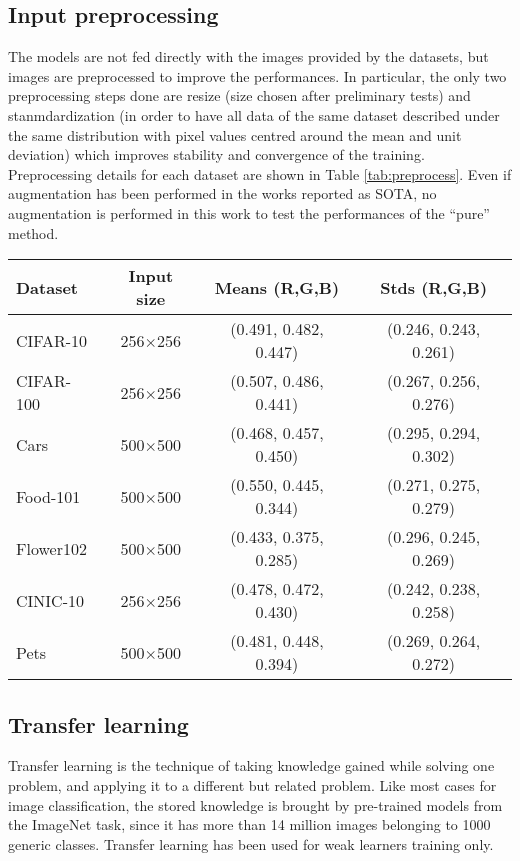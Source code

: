 \documentclass[review]{elsarticle}
\begin{document}
\subsection{Input preprocessing}
The models are not fed directly with the images provided by the datasets, but images are preprocessed to improve the performances. In particular, the only two preprocessing steps done are resize (size chosen after preliminary tests) and stanmdardization (in order to have all data of the same dataset described under the same distribution with pixel values centred around the mean and unit deviation) which improves stability and convergence of the training. Preprocessing details for each dataset are shown in Table \ref{tab:preprocess}. Even if augmentation has been performed in the works reported as SOTA, no augmentation is performed in this work to test the performances of the ``pure'' method.

\begin{table*}[h]
\caption{Input sizes and standardization values, for each channel, used for data preprocessing.}
\newcommand\T{\rule{0pt}{2.5ex}}
\begin{center}
\begin{tabular}{lccc}
{\bf Dataset} &  {\bf Input size} & {\bf Means (R,G,B)}  & {\bf Stds (R,G,B)}\\
    \hline
    \T
    CIFAR-10 & 256$\times$256 & (0.491, 0.482, 0.447) & (0.246, 0.243, 0.261)\\
    CIFAR-100& 256$\times$256 & (0.507, 0.486, 0.441) & (0.267, 0.256, 0.276)\\
    Cars & 500$\times$500 & (0.468, 0.457, 0.450) & (0.295, 0.294, 0.302)\\
    Food-101 & 500$\times$500 & (0.550, 0.445, 0.344) & (0.271, 0.275, 0.279)\\
    Flower102 & 500$\times$500 & (0.433, 0.375, 0.285) & (0.296, 0.245, 0.269)\\
    CINIC-10 & 256$\times$256 & (0.478, 0.472, 0.430) & (0.242, 0.238, 0.258)\\
    Pets & 500$\times$500 & (0.481, 0.448, 0.394) & (0.269, 0.264, 0.272)
\end{tabular}
\end{center}
\label{tab:preprocess}
\end{table*}

\subsection{Transfer learning}\label{transfer}
Transfer learning \cite{transfer} is the technique of taking knowledge gained while solving one problem,  and applying it to a different but related problem. Like most cases for image classification, the stored knowledge is brought by pre-trained models from the ImageNet \cite{imagenet} task,  since it has more than 14 million images belonging to 1000 generic classes. Transfer learning has been used for weak learners training only.
\end{document}
